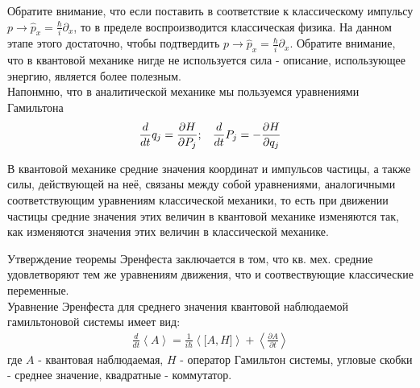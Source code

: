 ﻿\documentclass[__main__.tex]{subfiles}
\begin{document}
Обратите внимание, что если поставить в соответствие к классическому импульсу $p \rightarrow \widehat{p}_x = \frac{\hbar}{i}\partial_x$, то в пределе воспроизводится классическая физика. На данном этапе этого достаточно, чтобы подтвердить $p \rightarrow \widehat{p}_x = \frac{\hbar}{i}\partial_x$. Обратите внимание, что в квантовой механике нигде не используется сила - описание, использующее энергию, является более полезным.\\
Напонмню, что в аналитической механике мы пользуемся уравнениями Гамильтона
\begin{gather*}
    \frac{d}{dt}q_j = \frac{\partial{H}}{\partial{P_j}}; \hspace{3mm} \frac{d}{dt}P_j = -\frac{\partial{H}}{\partial{q_j}}
\end{gather*}
\begin{theorem}
    В квантовой механике средние значения координат и импульсов частицы, а также силы, действующей на неё, связаны между собой уравнениями, аналогичными соответствующим уравнениям классической механики, то есть при движении частицы средние значения этих величин в квантовой механике изменяются так, как изменяются значения этих величин в классической механике.
\end{theorem}
Утверждение теоремы Эренфеста заключается в том, что кв. мех. средние удовлетворяют тем же уравнениям движения, что и соотвествующие классические переменные.\\
Уравнение Эренфеста для среднего значения квантовой наблюдаемой гамильтоновой системы имеет вид:\\
\begin{gather*}
    \frac{d}{dt}\left< A \right> = \frac{1}{i\hbar}\left< \big[A,H\big] \right> + \left< \frac{\partial{A}}{\partial{t}} \right>
\end{gather*}
где $A$ - квантовая наблюдаемая, $H$ - оператор Гамильтон системы, угловые скобки - среднее значение, квадратные - коммутатор.
\end{document}
